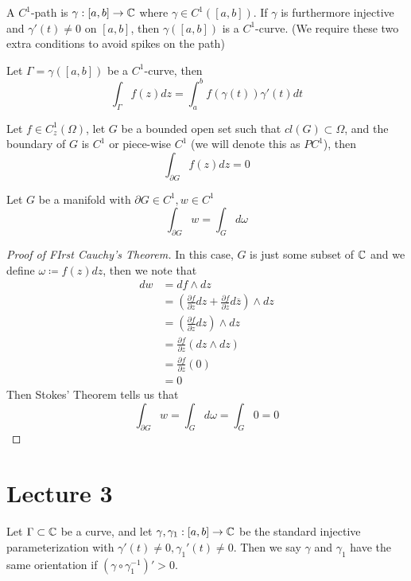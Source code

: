 \documentclass{article}
\begin{document}
\begin{definition}
A $C^1$-path is $\gamma: [a, b] \to \mathbb{C}$ where $\gamma \in C^1([a, b])$. If $\gamma$ is furthermore injective and $\gamma'(t) \neq 0$ on $[a, b]$, then $\gamma([a, b])$ is a $C^1$-curve. (We require these two extra conditions to avoid spikes on the path)
\end{definition}

\begin{definition}
Let $\Gamma = \gamma([a, b])$ be a $C^1$-curve, then
\[\int_\Gamma f(z) dz = \int_a^b f(\gamma(t)) \gamma'(t) dt\]
\end{definition}

\begin{theorem}
Let $f \in C^1_z(\Omega)$, let $G$ be a bounded open set such that $cl(G) \subset \Omega$, and the boundary of $G$ is $C^1$ or piece-wise $C^1$ (we will denote this as $PC^1$), then
\[\int_{\partial G} f(z) dz = 0\]
\end{theorem}

\begin{theorem}
Let $G$ be a manifold with $\partial G \in C^1, w \in C^1$
\[\int_{\partial G} w = \int_G d \omega\]
\end{theorem}

\begin{proof}[Proof of FIrst Cauchy's Theorem]
In this case, $G$ is just some subset of $\mathbb{C}$ and we define $\omega \coloneqq f(z) dz$, then we note that
\begin{align*}
    dw &= df \wedge dz\\
    &= (\frac{\partial f}{\partial z} dz + \frac{\partial f}{\partial \overline{z}} d\overline{z}) \wedge dz\\
    &= (\frac{\partial f}{\partial z} dz) \wedge dz \tag*{Cauchy-Riemann Equation}\\
    &= \frac{\partial f}{\partial z} (dz \wedge dz)\\
    &= \frac{\partial f}{\partial z} (0)\\
    &= 0
\end{align*}
Then Stokes' Theorem tells us that
\[\int_{\partial G} w = \int_G d \omega = \int_G 0 = 0\]
\end{proof}

\section{Lecture 3}

\begin{definition}
Let $\Gamma \subset \mathbb{C}$ be a curve, and let $\gamma, \gamma_1: [a, b] \to \mathbb{C}$ be the standard injective parameterization with $\gamma'(t) \neq 0, \gamma_1'(t) \neq 0$. Then we say $\gamma$ and $\gamma_1$ have the same orientation if $(\gamma \circ \gamma_1^{-1})' > 0$.
\end{definition}
\end{document}
